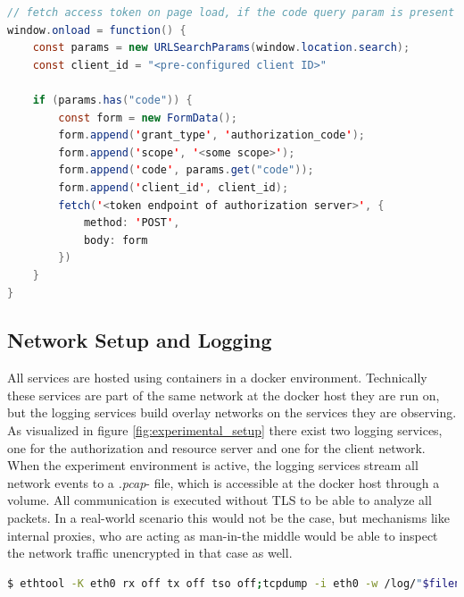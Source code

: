 \begin{minipage}\linewidth
\begin{lstlisting}[language={java}, caption={Example implementation of authorization code handling at the client}, label={lst:redirect_handler}]
// fetch access token on page load, if the code query param is present
window.onload = function() {
	const params = new URLSearchParams(window.location.search);
	const client_id = "<pre-configured client ID>"

	if (params.has("code")) {
		const form = new FormData();
		form.append('grant_type', 'authorization_code');
		form.append('scope', '<some scope>');
		form.append('code', params.get("code"));
		form.append('client_id', client_id);
		fetch('<token endpoint of authorization server>', {
			method: 'POST',
			body: form
		})
	}
}
\end{lstlisting}
\end{minipage}

\subsection{Network Setup and Logging}
All services are hosted using containers in a docker environment. Technically these services are part of the same network at the docker host they are run on, but the logging services build overlay networks on the services they are observing. As visualized in figure \ref{fig:experimental_setup} there exist two logging services, one for the authorization and resource server and one for the client network. When the experiment environment is active, the logging services stream all network events to a \emph{.pcap}- file, which is accessible at the docker host through a volume. All communication is executed without TLS to be able to analyze all packets. In a real-world scenario this would not be the case, but mechanisms like internal proxies, who are acting as man-in-the middle would be able to inspect the network traffic unencrypted in that case as well.

\begin{minipage}\linewidth
\begin{lstlisting}[language={bash}, caption={Logger process}, label={lst:logging_service}] 
$ ethtool -K eth0 rx off tx off tso off;tcpdump -i eth0 -w /log/"$filename_prefix"-log-$(date +"%Y%m%d_%H-%M-%S").pcap
\end{lstlisting}
\end{minipage}

